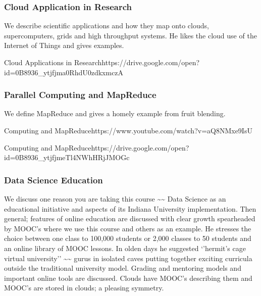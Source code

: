 \subsubsection{Cloud Application in
Research}\label{cloud-application-in-research}

We describe scientific applications and how they map onto clouds,
supercomputers, grids and high throughput systems. He likes the cloud
use of the Internet of Things and gives examples.




  {Cloud  Applications in Research}{https://drive.google.com/open?id=0B8936_ytjfjma0RhdU0zdkxmczA}

\subsubsection{Parallel Computing and
MapReduce}\label{parallel-computing-and-mapreduce}

We define MapReduce and gives a homely example from fruit blending.


  {Computing and  MapReduce}{https://www.youtube.com/watch?v=aQ8NMxe9IsU}


  {Computing  and MapReduce}{https://drive.google.com/open?id=0B8936_ytjfjmeTl4NWhHRjJMOGc}

\subsubsection{Data Science Education}\label{data-science-education}

We discuss one reason you are taking this course
\textasciitilde{}\textasciitilde{} Data Science as an educational
initiative and aspects of its Indiana University implementation. Then
general; features of online education are discussed with clear growth
spearheaded by MOOC's where we use this course and others as an example.
He stresses the choice between one class to 100,000 students or 2,000
classes to 50 students and an online library of MOOC lessons. In olden
days he suggested `'hermit's cage virtual university''
\textasciitilde{}\textasciitilde{} gurus in isolated caves putting
together exciting curricula outside the traditional university model.
Grading and mentoring models and important online tools are discussed.
Clouds have MOOC's describing them and MOOC's are stored in clouds; a
pleasing symmetry.


